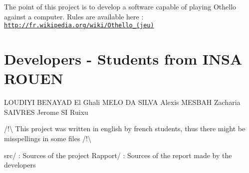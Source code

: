 The point of this project is to develop a software capable of playing Othello against a computer. Rules are available here \+: \href{http://fr.wikipedia.org/wiki/Othello_(jeu)}{\tt http\+://fr.\+wikipedia.\+org/wiki/\+Othello\+\_\+(jeu)}

\section*{Developers -\/ Students from I\+N\+SA R\+O\+U\+EN}

L\+O\+U\+D\+I\+YI B\+E\+N\+A\+Y\+AD El Ghali M\+E\+LO DA S\+I\+L\+VA Alexis M\+E\+S\+B\+AH Zacharia S\+A\+I\+V\+R\+ES Jerome SI Ruixu

/!\textbackslash{} This project was written in english by french students, thus there might be misspellings in some files /!\textbackslash{}

src/ \+: Sources of the project Rapport/ \+: Sources of the report made by the developers 